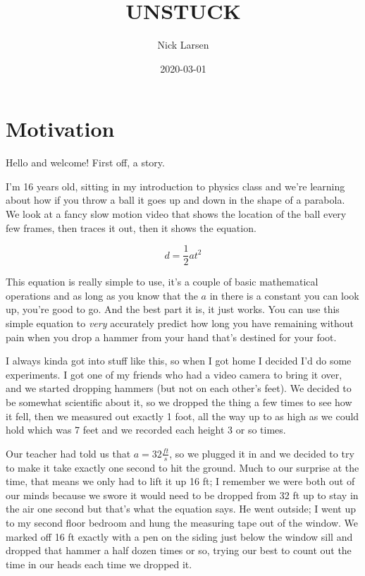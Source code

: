 \documentclass[]{book}
\title{UNSTUCK}
\author{Nick Larsen}
\date{2020-03-01}
\begin{document}
\maketitle

{
\setcounter{tocdepth}{1}
\tableofcontents
}
\hypertarget{motivation}{%
\chapter*{Motivation}\label{motivation}}

Hello and welcome! First off, a story.

I'm 16 years old, sitting in my introduction to physics class and we're learning about how if you throw a ball it goes up and down in the shape of a parabola. We look at a fancy slow motion video that shows the location of the ball every few frames, then traces it out, then it shows the equation.

\[d = \frac{1}{2}at^2\]

This equation is really simple to use, it's a couple of basic mathematical operations and as long as you know that the \(a\) in there is a constant you can look up, you're good to go. And the best part it is, it just works. You can use this simple equation to \emph{very} accurately predict how long you have remaining without pain when you drop a hammer from your hand that's destined for your foot.

I always kinda got into stuff like this, so when I got home I decided I'd do some experiments. I got one of my friends who had a video camera to bring it over, and we started dropping hammers (but not on each other's feet). We decided to be somewhat scientific about it, so we dropped the thing a few times to see how it fell, then we measured out exactly 1 foot, all the way up to as high as we could hold which was 7 feet and we recorded each height 3 or so times.

Our teacher had told us that \(a = 32\frac{ft}{s}\), so we plugged it in and we decided to try to make it take exactly one second to hit the ground. Much to our surprise at the time, that means we only had to lift it up 16 ft; I remember we were both out of our minds because we swore it would need to be dropped from 32 ft up to stay in the air one second but that's what the equation says. He went outside; I went up to my second floor bedroom and hung the measuring tape out of the window. We marked off 16 ft exactly with a pen on the siding just below the window sill and dropped that hammer a half dozen times or so, trying our best to count out the time in our heads each time we dropped it.
\end{document}
